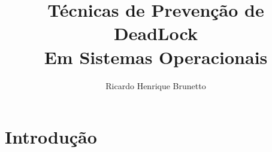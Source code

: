 

\sloppy

\title{Técnicas de Prevenção de DeadLock\\Em Sistemas Operacionais}

\author{Ricardo Henrique Brunetto}


\address{Departamento de Informática -- Universidade Estadual de Maringá (UEM)\\
	Maringá -- PR -- Brasil
}



	\maketitle

	{\resumo{}}

  \section{Introdução}

	
	


